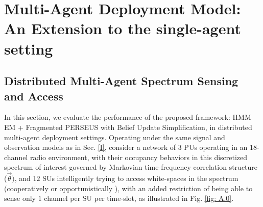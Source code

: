 \documentclass[10pt, twocolumn]{IEEEtran}
\begin{document}
\section{Multi-Agent Deployment Model: An Extension to the single-agent setting}\label{Z}
\subsection{Distributed Multi-Agent Spectrum Sensing and Access}
In this section, we evaluate the performance of the proposed framework: HMM EM + Fragmented PERSEUS with Belief Update Simplification, in distributed multi-agent deployment settings. Operating under the same signal and observation models as in Sec. \ref{I}, consider a network of $3$ PUs operating in an 18-channel radio environment, with their occupancy behaviors in this discretized spectrum of interest governed by Markovian time-frequency correlation structure ($\vec{\theta})$, and $12$ SUs intelligently trying to access white-spaces in the spectrum (cooperatively \cite{WCL:5} or opportunistically \cite{WCL:MIT}), with an added restriction of being able to sense only $1$ channel per SU per time-slot, as illustrated in Fig. \ref{fig: A.0}.
\end{document}

